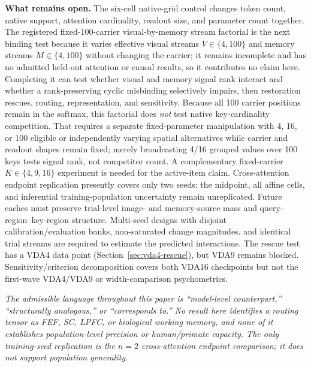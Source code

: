 \documentclass[10pt]{article}
\newcommand{\note}[1]{\textcolor{NoteGray}{\textit{#1}}}
\begin{document}
\textbf{What remains open.} The six-cell native-grid control changes token count, native support, attention cardinality, readout size, and parameter count together. The registered fixed-100-carrier visual-by-memory stream factorial is the next binding test because it varies effective visual streams $V\in\{4,100\}$ and memory streams $M\in\{4,100\}$ without changing the carrier; it remains incomplete and has no admitted held-out attention or causal results, so it contributes no claim here. Completing it can test whether visual and memory signal rank interact and whether a rank-preserving cyclic misbinding selectively impairs, then restoration rescues, routing, representation, and sensitivity. Because all 100 carrier positions remain in the softmax, this factorial does \emph{not} test native key-cardinality competition. That requires a separate fixed-parameter manipulation with 4, 16, or 100 eligible or independently varying spatial alternatives while carrier and readout shapes remain fixed; merely broadcasting 4/16 grouped values over 100 keys tests signal rank, not competitor count. A complementary fixed-carrier $K\in\{4,9,16\}$ experiment is needed for the active-item claim. Cross-attention endpoint replication presently covers only two seeds; the midpoint, all affine cells, and inferential training-population uncertainty remain unreplicated. Future caches must preserve trial-level image- and memory-source mass and query-region--key-region structure. Multi-seed designs with disjoint calibration/evaluation banks, non-saturated change magnitudes, and identical trial streams are required to estimate the predicted interactions. The rescue test has a VDA4 data point (Section~\ref{sec:vda4-rescue}), but VDA9 remains blocked. Sensitivity/criterion decomposition covers both VDA16 checkpoints but not the first-wave VDA4/VDA9 or width-comparison psychometrics.

\note{The admissible language throughout this paper is ``model-level counterpart,'' ``structurally analogous,'' or ``corresponds to.'' No result here identifies a routing tensor as FEF, SC, LPFC, or biological working memory, and none of it establishes population-level precision or human/primate capacity. The only training-seed replication is the $n=2$ cross-attention endpoint comparison; it does not support population generality.}

\FloatBarrier
\end{document}
